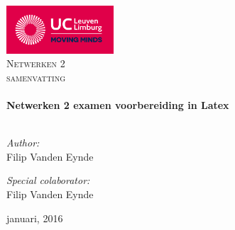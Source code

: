 \begin{titlepage}
\vbox{ }

\vbox{ }

\begin{center}
\includegraphics[width=0.30\textwidth]{./img/logo_ucleuvenlimburg_rgb.png}\\[1cm]
\textsc{\LARGE Netwerken 2}\\[1.5cm]
\textsc{\Large  samenvatting}\\[0.5cm]

\vbox{ }
\HRule \\[0.4cm]
{ \huge \bfseries Netwerken 2 examen voorbereiding in Latex}\\[0.4cm]
\HRule \\[1.5cm]
\begin{minipage}{0.4\textwidth}
\begin{flushleft} \large
\emph{Author:}\\
Filip Vanden Eynde
\end{flushleft}
\end{minipage}
\begin{minipage}{0.4\textwidth}
\begin{flushright} \large
\emph{Special colaborator:} \\
Filip Vanden Eynde
\end{flushright}
\end{minipage}
\vfill
{\large januari, 2016}
\end{center}
\end{titlepage}